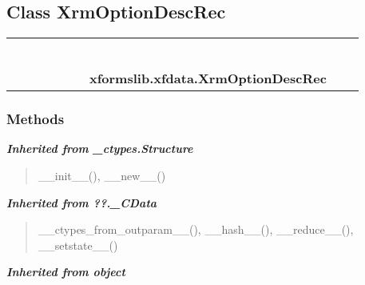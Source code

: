 \subsection{Class XrmOptionDescRec}

    \label{xformslib:xfdata:XrmOptionDescRec}
\begin{tabular}{cccccccccc}
\multicolumn{2}{r}{\settowidth{\BCL}{object}\multirow{2}{\BCL}{object}}
&&
&&
&&
  \\\cline{3-3}
  &&\multicolumn{1}{c|}{}
&&
&&
&&
  \\
\multicolumn{4}{r}{\settowidth{\BCL}{??.\_CData}\multirow{2}{\BCL}{??.\_CData}}
&&
&&
  \\\cline{5-5}
  &&&&\multicolumn{1}{c|}{}
&&
&&
  \\
\multicolumn{6}{r}{\settowidth{\BCL}{\_ctypes.Structure}\multirow{2}{\BCL}{\_ctypes.Structure}}
&&
  \\\cline{7-7}
  &&&&&&\multicolumn{1}{c|}{}
&&
  \\
&&&&&&\multicolumn{2}{l}{\textbf{xformslib.xfdata.XrmOptionDescRec}}
\end{tabular}



  \subsubsection{Methods}


\large{\textbf{\textit{Inherited from \_ctypes.Structure}}}

\begin{quote}
\_\_init\_\_(), \_\_new\_\_()
\end{quote}

\large{\textbf{\textit{Inherited from ??.\_CData}}}

\begin{quote}
\_\_ctypes\_from\_outparam\_\_(), \_\_hash\_\_(), \_\_reduce\_\_(), \_\_setstate\_\_()
\end{quote}

\large{\textbf{\textit{Inherited from object}}}

